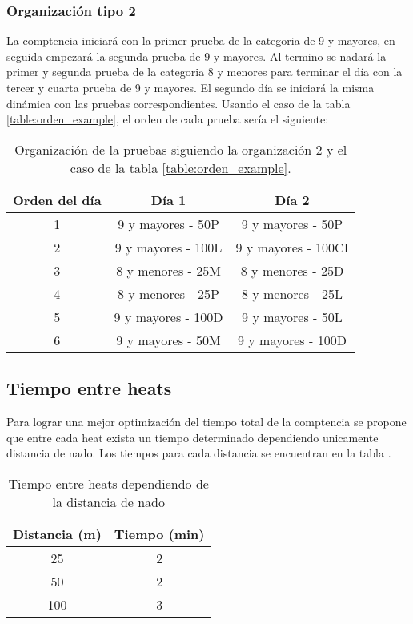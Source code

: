 \subsubsection{Organización tipo 2}
La comptencia iniciará con la primer prueba de la categoria de 9 y mayores, en seguida empezará la segunda prueba de 9 y mayores. Al termino se nadará la primer y segunda prueba de la categoria 8 y menores para terminar el día con la tercer y cuarta prueba de 9 y mayores.  El segundo día se iniciará la misma dinámica con las pruebas correspondientes. Usando el caso de la tabla \ref{table:orden_example}, el orden de cada prueba sería el siguiente:
\begin{table}[H]
    \centering
    \begin{tabular}{ccc}
        \hline
        Orden del día & Día 1              & Día 2               \\  \hline
        1             & 9 y mayores - 50P  & 9 y mayores - 50P   \\
        2             & 9 y mayores - 100L & 9 y mayores - 100CI \\
        3             & 8 y menores - 25M  & 8 y menores - 25D   \\
        4             & 8 y menores - 25P  & 8 y menores - 25L   \\
        5             & 9 y mayores - 100D & 9 y mayores - 50L   \\
        6             & 9 y mayores - 50M  & 9 y mayores - 100D  \\ \hline
    \end{tabular}
    \caption{Organización de la pruebas siguiendo la organización 2 y el caso de la tabla \ref{table:orden_example}.}
    \label{table:organization2}
\end{table}

\subsection{Tiempo entre heats}
Para lograr una mejor optimización del tiempo total  de la comptencia se propone que entre cada heat exista un tiempo determinado dependiendo unicamente distancia de nado. Los tiempos para cada distancia se encuentran en la tabla  .
\begin{table}[H]
    \centering
    \begin{tabular}{cc}
        \hline
        Distancia (m) & Tiempo (min) \\ \hline
        25            & 2            \\
        50            & 2            \\
        100           & 3            \\  \hline
    \end{tabular}
    \caption{Tiempo entre heats dependiendo de la distancia de nado}
    \label{table:tiempos}
\end{table}